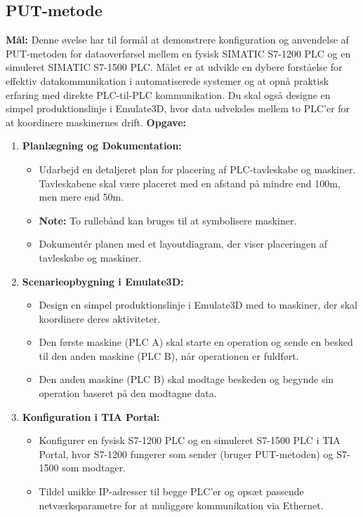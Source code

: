 \subsection*{PUT-metode}
\label{subsec:put_method_plc_communication}
\textbf{Mål:} Denne øvelse har til formål at demonstrere konfiguration og anvendelse af PUT-metoden for dataoverførsel mellem en fysisk SIMATIC S7-1200 PLC og en simuleret SIMATIC S7-1500 PLC. Målet er at udvikle en dybere forståelse for effektiv datakommunikation i automatiserede systemer og at opnå praktisk erfaring med direkte PLC-til-PLC kommunikation. Du skal også designe en simpel produktionslinje i Emulate3D, hvor data udveksles mellem to PLC'er for at koordinere maskinernes drift.
\newline\newline
\noindent\textbf{Opgave:}
\begin{enumerate}
	\item \textbf{Planlægning og Dokumentation:}
	\begin{itemize}
		\item Udarbejd en detaljeret plan for placering af PLC-tavleskabe og maskiner. Tavleskabene skal være placeret med en afstand på mindre end 100m, men mere end 50m.
		\item \textbf{Note:} To rullebånd kan bruges til at symbolisere maskiner.
		\item Dokumentér planen med et layoutdiagram, der viser placeringen af tavleskabe og maskiner.
	\end{itemize}
	\item \textbf{Scenarieopbygning i Emulate3D:}
	\begin{itemize}
		\item Design en simpel produktionslinje i Emulate3D med to maskiner, der skal koordinere deres aktiviteter.
		\item Den første maskine (PLC A) skal starte en operation og sende en besked til den anden maskine (PLC B), når operationen er fuldført.
		\item Den anden maskine (PLC B) skal modtage beskeden og begynde sin operation baseret på den modtagne data.
	\end{itemize}
	\item \textbf{Konfiguration i TIA Portal:}
	\begin{itemize}
		\item Konfigurer en fysisk S7-1200 PLC og en simuleret S7-1500 PLC i TIA Portal, hvor S7-1200 fungerer som sender (bruger PUT-metoden) og S7-1500 som modtager.
		\item Tildel unikke IP-adresser til begge PLC'er og opsæt passende netværksparametre for at muliggøre kommunikation via Ethernet.

\end{itemize}
\end{enumerate}

